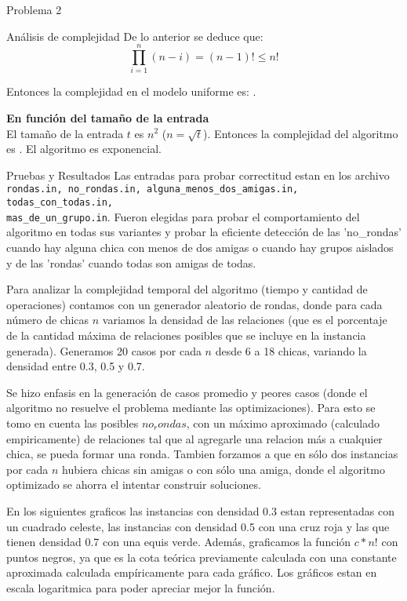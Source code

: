 \begin{section}{Problema 2}
\begin{subsection}{Análisis de complejidad}
			De lo anterior se deduce que: $$\displaystyle\prod_{i=1}^n (n-i) = (n-1)! \leq n!$$

			Entonces la complejidad en el modelo uniforme es:  .\VSP
		
			\noindent\textbf{En función del tamaño de la entrada}\\

				El tamaño de la entrada $t$ es $n^2$ ($n=\sqrt t$). Entonces la complejidad del algoritmo es . El algoritmo es exponencial.
	\end{subsection}

	\begin{subsection}{Pruebas y Resultados}
		Las entradas para probar correctitud estan en los archivo \texttt{rondas.in, no\_rondas.in, alguna\_menos\_dos\_amigas.in, todas\_con\_todas.in, \\
		mas\_de\_un\_grupo.in}.
		Fueron elegidas para probar el comportamiento del algoritmo en todas sus variantes y probar la eficiente detección de las 'no\_rondas' cuando hay alguna chica con menos de dos amigas o cuando hay grupos aislados y de las 'rondas' cuando todas son amigas de todas.
		
		Para analizar la complejidad temporal del algoritmo (tiempo y cantidad de operaciones) contamos con un generador aleatorio de rondas, donde para cada número de chicas $n$ variamos la densidad de las relaciones (que es el porcentaje de la cantidad máxima de relaciones posibles que se incluye en la instancia generada). Generamos 20 casos por cada $n$ desde 6 a 18 chicas, variando la densidad entre 0.3, 0.5 y 0.7.

		 Se hizo enfasis en la generación de casos promedio y peores casos (donde el algoritmo no resuelve el problema mediante las optimizaciones). Para esto se tomo en cuenta las posibles $no_rondas$, con un máximo aproximado (calculado empiricamente) de relaciones tal que al agregarle una relacion más a cualquier chica, se pueda formar una ronda. Tambien forzamos a que en sólo dos instancias por cada $n$ hubiera chicas sin amigas o con sólo una amiga, donde el algoritmo optimizado se ahorra el intentar construir soluciones.
		
		En los siguientes graficos las instancias con densidad 0.3 estan representadas con un cuadrado celeste, las instancias con densidad 0.5 con una cruz roja y las que tienen densidad 0.7 con una equis verde. Además, graficamos la función $c*n!$ con puntos negros, ya que es la cota teórica previamente calculada con una constante aproximada calculada empíricamente para cada gráfico.
		Los gráficos estan en escala logaritmica para poder apreciar mejor la función.\VSP
		

\end{subsection}
\end{section}
